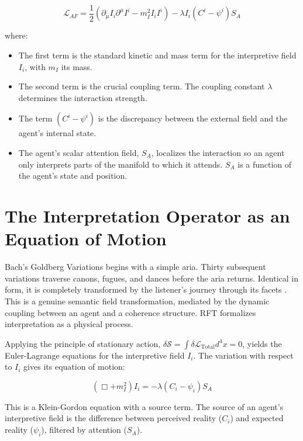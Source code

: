 \begin{equation}
\mathcal{L}_{AF} = \frac{1}{2} \left( \partial_\mu I_i \partial^\mu I^i - m_I^2 I_i I^i \right) - \lambda I_i (C^i - \psi^i) S_A
\end{equation}

where:
\begin{itemize}
    \item The first term is the standard kinetic and mass term for the interpretive field \(I_i\), with \(m_I\) its mass.
    \item The second term is the crucial coupling term. The coupling constant \(\lambda\) determines the interaction strength.
    \item The term \((C^i - \psi^i)\) is the discrepancy between the external field and the agent's internal state.
    \item The agent's scalar attention field, \(S_A\), localizes the interaction so an agent only interprets parts of the manifold to which it attends. \(S_A\) is a function of the agent's state and position.
\end{itemize}

\section{The Interpretation Operator as an Equation of Motion}

Bach's Goldberg Variations begins with a simple aria. Thirty subsequent variations traverse canons, fugues, and dances before the aria returns. Identical in form, it is completely transformed by the listener's journey through its facets \autocite{Bach1741}. This is a genuine semantic field transformation, mediated by the dynamic coupling between an agent and a coherence structure. RFT formalizes interpretation as a physical process.

Applying the principle of stationary action, \(\delta \mathcal{S} = \int \delta \mathcal{L}_{\text{Total}} d^4x = 0\), yields the Euler-Lagrange equations for the interpretive field \(I_i\). The variation with respect to \(I_i\) gives its equation of motion:

\begin{equation}
(\Box + m_I^2) I_i = -\lambda (C_i - \psi_i) S_A
\end{equation}

This is a Klein-Gordon equation with a source term. The source of an agent's interpretive field is the difference between perceived reality (\(C_i\)) and expected reality (\(\psi_i\)), filtered by attention (\(S_A\)).

